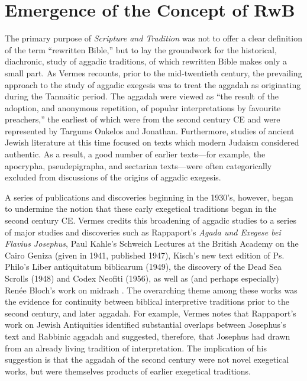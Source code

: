 \section{Emergence of the Concept of
RwB}\label{emergence-of-the-concept-of-rwb}

The primary purpose of \emph{Scripture and Tradition} was not to offer a
clear definition of the term ``rewritten Bible,'' but to lay the
groundwork for the historical, diachronic, study of aggadic traditions,
of which rewritten Bible makes only a small
part.\autocite[3]{vermes_zsengeller2014} As Vermes recounts, prior to
the mid-twentieth century, the prevailing approach to the study of
aggadic exegesis was to treat the aggadah as originating during the
Tannaitic period. The aggadah were viewed as ``the result of the
adoption, and anonymous repetition, of popular interpretations by
favourite preachers,'' \autocite[3]{vermes1961} the earliest of which
were from the second century CE and were represented by Targums Onkelos
and Jonathan. Furthermore, studies of ancient Jewish literature at this
time focused on texts which modern Judaism considered authentic. As a
result, a good number of earlier texts---for example, the apocrypha,
pseudepigrapha, and sectarian texts---were often categorically excluded
from discussions of the origins of aggadic
exegesis.\autocite[2]{vermes1961}

A series of publications and discoveries beginning in the 1930's,
however, began to undermine the notion that these early exegetical
traditions began in the second century CE. Vermes credits this
broadening of aggadic studies to a series of major studies and
discoveries such as Rappaport's \emph{Agada und Exegese bei Flavius
Josephus},\autocite{rappaport1930} Paul Kahle's Schweich Lectures at the
British Academy on the Cairo Geniza (given in 1941, published
1947),\autocite{kahle1947} Kisch's new text edition of Ps. Philo's
Liber antiquitatum biblicarum (1949),\autocite{kisch1949} the discovery
of the Dead Sea Scrolls (1948) and Codex Neofiti (1956), as well as (and
perhaps especially) Renée Bloch's work on midrash
\autocites{bloch1954}{bloch1955_repr}[3--7]{vermes1961}. The overarching
theme among these works was the evidence for continuity between biblical
interpretive traditions prior to the second century, and later aggadah.
For example, Vermes notes that Rappaport's work on Jewish Antiquities
identified substantial overlaps between Josephus's text and Rabbinic
aggadah and suggested, therefore, that Josephus had drawn from an
already living tradition of interpretation. The implication of his
suggestion is that the aggadah of the second century were not novel
exegetical works, but were themselves products of earlier exegetical
traditions.

